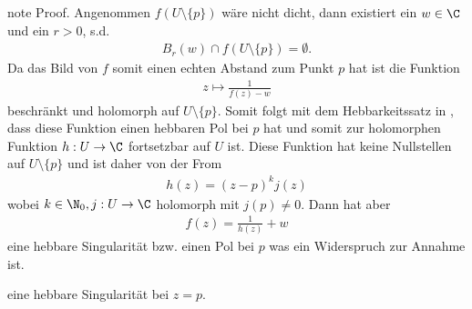 \documentclass[letterpaper,10pt,german]{jupyterBook}
\begin{document}
\begin{sphinxadmonition}{note}
\sphinxAtStartPar
Proof. Angenommen \(f(U\setminus\{p\})\) wäre nicht dicht, dann existiert ein \(w\in\C\) und ein \(r>0\), s.d.
\begin{equation*}
\begin{split}B_r(w) \cap f(U\setminus\{p\}) = \emptyset.\end{split}
\end{equation*}
\sphinxAtStartPar
Da das Bild von \(f\) somit einen echten Abstand zum Punkt \(p\) hat ist die Funktion
\begin{equation*}
\begin{split}z\mapsto\frac{1}{f(z) - w}\end{split}
\end{equation*}
\sphinxAtStartPar
beschränkt und holomorph auf \(U\setminus\{p\}\). Somit folgt mit dem Hebbarkeitssatz in {\hyperref[\detokenize{complexanalysis/residuensatz:thm:hebbar}]{}}, dass diese Funktion einen hebbaren Pol bei \(p\) hat und somit zur holomorphen Funktion \(h:U\to\C\) fortsetzbar auf \(U\) ist. Diese Funktion hat keine Nullstellen auf \(U\setminus\{p\}\) und ist daher von der From
\begin{equation*}
\begin{split}h(z) = (z-p)^k j(z)\end{split}
\end{equation*}
\sphinxAtStartPar
wobei \(k\in\N_0, j:U\to\C\) holomorph mit \(j(p)\neq 0\). Dann hat aber
\begin{equation*}
\begin{split}f(z) = \frac{1}{h(z)} + w\end{split}
\end{equation*}
\sphinxAtStartPar
eine hebbare Singularität bzw. einen Pol bei \(p\) was ein Widerspruch zur Annahme ist.

\sphinxAtStartPar
eine hebbare Singularität bei \(z=p\).
\end{sphinxadmonition}
\end{document}
